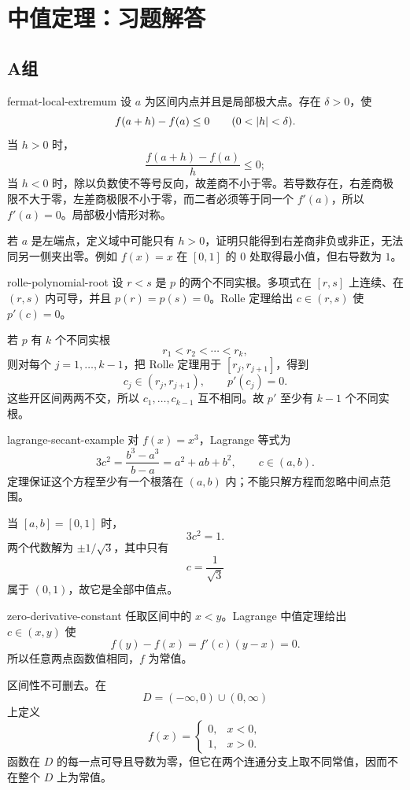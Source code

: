 \chapter{中值定理：习题解答}

\section*{A组}

\begin{solution}{fermat-local-extremum}
设 \(a\) 为区间内点并且是局部极大点。存在 \(\delta>0\)，使
\[
 f(a+h)-f(a)\le0\qquad(0<\left|h\right|<\delta).
\]
当 \(h>0\) 时，
\[
 \frac{f(a+h)-f(a)}h\le0;
\]
当 \(h<0\) 时，除以负数使不等号反向，故差商不小于零。若导数存在，右差商极限不大于零，左差商极限不小于零，而二者必须等于同一个 \(f'(a)\)，所以 \(f'(a)=0\)。局部极小情形对称。

若 \(a\) 是左端点，定义域中可能只有 \(h>0\)，证明只能得到右差商非负或非正，无法同另一侧夹出零。例如 \(f(x)=x\) 在 \([0,1]\) 的 \(0\) 处取得最小值，但右导数为 \(1\)。
\end{solution}

\begin{solution}{rolle-polynomial-root}
设 \(r<s\) 是 \(p\) 的两个不同实根。多项式在 \([r,s]\) 上连续、在 \((r,s)\) 内可导，并且 \(p(r)=p(s)=0\)。Rolle 定理给出 \(c\in(r,s)\) 使 \(p'(c)=0\)。

若 \(p\) 有 \(k\) 个不同实根
\[
 r_1<r_2<\cdots<r_k,
\]
则对每个 \(j=1,\ldots,k-1\)，把 Rolle 定理用于 \([r_j,r_{j+1}]\)，得到
\[
 c_j\in(r_j,r_{j+1}),\qquad p'(c_j)=0.
\]
这些开区间两两不交，所以 \(c_1,\ldots,c_{k-1}\) 互不相同。故 \(p'\) 至少有 \(k-1\) 个不同实根。
\end{solution}

\begin{solution}{lagrange-secant-example}
对 \(f(x)=x^3\)，Lagrange 等式为
\[
 3c^2=\frac{b^3-a^3}{b-a}=a^2+ab+b^2,
\qquad c\in(a,b).
\]
定理保证这个方程至少有一个根落在 \((a,b)\) 内；不能只解方程而忽略中间点范围。

当 \([a,b]=[0,1]\) 时，
\[
 3c^2=1.
\]
两个代数解为 \(\pm1/\sqrt3\)，其中只有
\[
 c=\frac1{\sqrt3}
\]
属于 \((0,1)\)，故它是全部中值点。
\end{solution}

\begin{solution}{zero-derivative-constant}
任取区间中的 \(x<y\)。Lagrange 中值定理给出 \(c\in(x,y)\) 使
\[
 f(y)-f(x)=f'(c)(y-x)=0.
\]
所以任意两点函数值相同，\(f\) 为常值。

区间性不可删去。在
\[
 D=(-\infty,0)\cup(0,\infty)
\]
上定义
\[
 f(x)=
 \begin{cases}
 0,&x<0,\\
 1,&x>0.
 \end{cases}
\]
函数在 \(D\) 的每一点可导且导数为零，但它在两个连通分支上取不同常值，因而不在整个 \(D\) 上为常值。
\end{solution}

